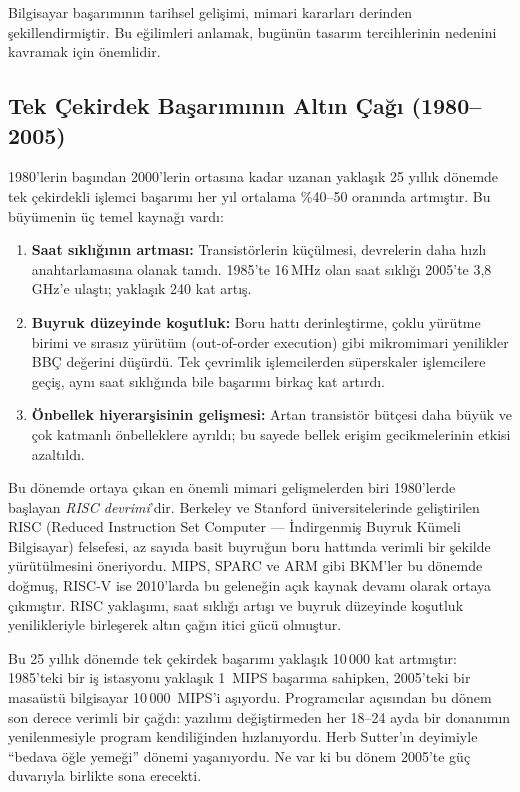 Bilgisayar başarımının tarihsel gelişimi, mimari kararları derinden şekillendirmiştir. Bu eğilimleri anlamak, bugünün tasarım tercihlerinin nedenini kavramak için önemlidir.

\subsection{Tek Çekirdek Başarımının Altın Çağı (1980--2005)}
\label{subsec:altin-cag}

1980'lerin başından 2000'lerin ortasına kadar uzanan yaklaşık 25 yıllık dönemde tek çekirdekli işlemci başarımı her yıl ortalama \%40--50 oranında artmıştır. Bu büyümenin üç temel kaynağı vardı:

\begin{enumerate}
    \item \textbf{Saat sıklığının artması:} Transistörlerin küçülmesi, devrelerin daha hızlı anahtarlamasına olanak tanıdı. 1985'te 16\,MHz olan saat sıklığı 2005'te 3,8\,GHz'e ulaştı; yaklaşık 240 kat artış.

    \item \textbf{Buyruk düzeyinde koşutluk:} Boru hattı derinleştirme, çoklu yürütme birimi ve sırasız yürütüm (out-of-order execution) gibi mikromimari yenilikler BBÇ değerini düşürdü. Tek çevrimlik işlemcilerden süperskaler işlemcilere geçiş, aynı saat sıklığında bile başarımı birkaç kat artırdı.

    \item \textbf{Önbellek hiyerarşisinin gelişmesi:} Artan transistör bütçesi daha büyük ve çok katmanlı önbelleklere ayrıldı; bu sayede bellek erişim gecikmelerinin etkisi azaltıldı.
\end{enumerate}

Bu dönemde ortaya çıkan en önemli mimari gelişmelerden biri 1980'lerde başlayan \emph{RISC devrimi}'dir. Berkeley ve Stanford üniversitelerinde geliştirilen RISC (Reduced Instruction Set Computer --- İndirgenmiş Buyruk Kümeli Bilgisayar) felsefesi, az sayıda basit buyruğun boru hattında verimli bir şekilde yürütülmesini öneriyordu. MIPS, SPARC ve ARM gibi BKM'ler bu dönemde doğmuş, RISC-V ise 2010'larda bu geleneğin açık kaynak devamı olarak ortaya çıkmıştır. RISC yaklaşımı, saat sıklığı artışı ve buyruk düzeyinde koşutluk yenilikleriyle birleşerek altın çağın itici gücü olmuştur.

Bu 25 yıllık dönemde tek çekirdek başarımı yaklaşık 10\,000 kat artmıştır: 1985'teki bir iş istasyonu yaklaşık 1~MIPS başarıma sahipken, 2005'teki bir masaüstü bilgisayar 10\,000~MIPS'i aşıyordu. Programcılar açısından bu dönem son derece verimli bir çağdı: yazılımı değiştirmeden her 18--24 ayda bir donanımın yenilenmesiyle program kendiliğinden hızlanıyordu. Herb Sutter'ın deyimiyle ``bedava öğle yemeği'' dönemi yaşanıyordu. Ne var ki bu dönem 2005'te güç duvarıyla birlikte sona erecekti.

